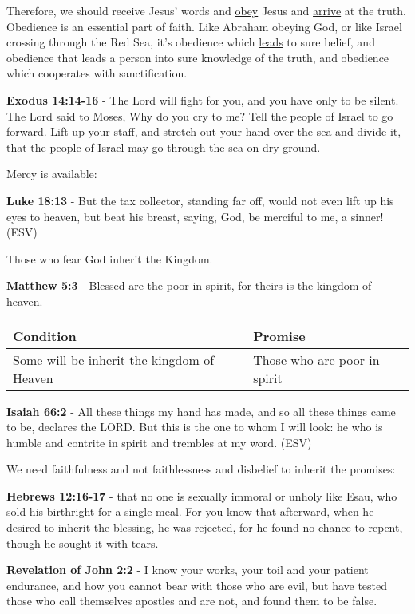 \documentclass[11pt]{article}
\begin{document}
Therefore, we should receive Jesus' words and \uline{obey} Jesus and \uline{arrive} at the truth. Obedience is an essential part of faith. Like Abraham obeying God, or like Israel crossing through the Red Sea, it's obedience which \uline{leads} to sure belief, and obedience that leads a person into sure knowledge of the truth, and obedience which cooperates with sanctification.

\textbf{Exodus 14:14-16} - The Lord will fight for you, and you have only to be silent.  The Lord said to Moses, Why do you cry to me? Tell the people of Israel to go forward.  Lift up your staff, and stretch out your hand over the sea and divide it, that the people of Israel may go through the sea on dry ground.

Mercy is available:

\textbf{Luke 18:13} - But the tax collector, standing far off, would not even lift up his eyes to heaven, but beat his breast, saying, God, be merciful to me, a sinner! (ESV)

Those who fear God inherit the Kingdom.

\textbf{Matthew 5:3} - Blessed are the poor in spirit, for theirs is the kingdom of heaven.

\begin{center}
\begin{tabular}{ll}
Condition & Promise\\[0pt]
\hline
Some will be inherit the kingdom of Heaven & Those who are poor in spirit\\[0pt]
\end{tabular}
\end{center}

\textbf{Isaiah 66:2} - All these things my hand has made, and so all these things came to be, declares the LORD. But this is the one to whom I will look: he who is humble and contrite in spirit and trembles at my word. (ESV)

We need faithfulness and not faithlessness and disbelief to inherit the promises:

\textbf{Hebrews 12:16-17} - that no one is sexually immoral or unholy like Esau, who sold his birthright for a single meal. For you know that afterward, when he desired to inherit the blessing, he was rejected, for he found no chance to repent, though he sought it with tears.

\textbf{Revelation of John 2:2} - I know your works, your toil and your patient endurance, and how you cannot bear with those who are evil, but have tested those who call themselves apostles and are not, and found them to be false.
\end{document}
